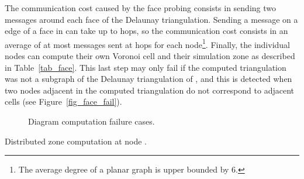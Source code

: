 \documentclass{article}
\begin{document}
The communication cost caused by the face probing consists in sending two messages around each face of the Delaunay triangulation.
Sending a message on a edge of a face in  can take up to  hops, so the communication cost consists in an average of at most  messages sent at  hops for each node\footnote{The average degree of a planar graph is upper bounded by 6.}. Finally, the individual nodes can compute their own Voronoi cell and their simulation zone as described in Table~\ref{tab_face}. This last step may only fail if the computed triangulation was not a subgraph of the Delaunay triangulation of , and this is detected when two nodes adjacent in the computed triangulation do not correspond to adjacent cells (see Figure~\ref{fig_face_fail}).

\begin{figure}[htbp]
\begin{center}
\hspace{0.5cm}
\caption{Diagram computation failure cases.}
\label{fig_sinr}
\end{center}
\end{figure}


\begin{table}[htp]
\begin{center}
\end{center}
\caption{Distributed zone computation at node .}
\label{tab_face}
\end{table}
\end{document}

